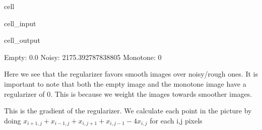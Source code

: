 \documentclass[letterpaper,10pt,english]{jupyterBook}
\begin{document}
\begin{sphinxuseclass}{cell}\begin{sphinxVerbatimInput}

\begin{sphinxuseclass}{cell_input}
\begin{sphinxVerbatim}[commandchars=\\\{\}]
\end{sphinxVerbatim}

\end{sphinxuseclass}\end{sphinxVerbatimInput}
\begin{sphinxVerbatimOutput}

\begin{sphinxuseclass}{cell_output}
\begin{sphinxVerbatim}[commandchars=\\\{\}]
Empty: \PYGZhy{}0.0
Noisy: \PYGZhy{}2175.392787838805
Monotone: 0
\end{sphinxVerbatim}

\end{sphinxuseclass}\end{sphinxVerbatimOutput}

\end{sphinxuseclass}
\sphinxAtStartPar
Here we see that the regularizer favors smooth images over noisy/rough ones. It is important to note that both the empty image and the monotone image have a regularizer of 0. This is because we weight the images towards smoother images.

\sphinxAtStartPar
This is the gradient of the regularizer.
We calculate each point in the picture by doing \(x_{i+1,j} + x_{i-1,j} + x_{i,j+1} + x_{i,j-1} - 4x_{i,j}\) for each i,j pixels
\end{document}

